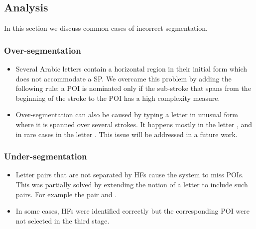 \documentclass[10pt, conference, compsocconf]{IEEEtran}
\begin{document}

\subsection{Analysis}
In this section we discuss common cases of incorrect segmentation.
\subsubsection{Over-segmentation}
\begin{itemize}
\item Several Arabic letters contain a horizontal region in their initial form which does not accommodate a SP. We overcame this problem by adding the following rule: a POI is nominated only if the sub-stroke that spans from the beginning of the stroke to the POI has a high complexity measure.
\item Over-segmentation can also be caused by typing a letter in unusual form where it is spanned over several strokes. 
It happens mostly in the letter ,  and in rare cases in the letter . This issue will be addressed in a future work.
\end{itemize}

\subsubsection{Under-segmentation}
\begin{itemize}
\item Letter pairs that are not separated by HFs cause the system to miss POIs. This was partially solved by extending the notion of a letter to include such pairs. For example the pair  and .
\item In some cases, HFs were identified correctly but the corresponding POI were not selected in the third stage. 
\end{itemize}
\end{document}
